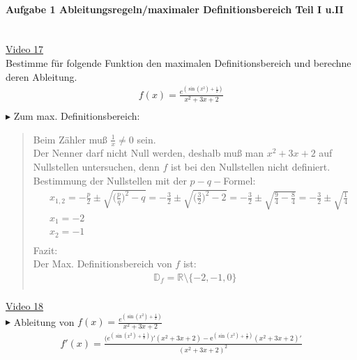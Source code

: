 \paragraph{Aufgabe 1 Ableitungsregeln/maximaler Definitionsbereich Teil I u.II}$  $\vspace*{3mm}\\
\href{https://youtu.be/fz6oN4-i_84}{Video 17}\\
Bestimme für folgende Funktion den maximalen Definitionsbereich und berechne deren Ableitung.\\
\begin{align*}
f(x)=\frac{e^{(\sin(x^2)+\frac{1}{x})}}{x^2+3x+2}\\
\end{align*}
\newpage
\noindent
$\blacktriangleright$ Zum max. Definitionsbereich:\\
\begin{quote}
	Beim Zähler muß $ \frac{1}{x}\neq 0 $ sein.\\
	Der Nenner darf nicht Null werden, deshalb muß man $ x^2+3x+2 $ auf Nullstellen untersuchen, denn $ f $ ist bei den Nullstellen nicht definiert.\\
	Bestimmung der Nullstellen mit der $ p-q- $Formel:\\
	\begin{align*}
	&x_{1,2}=-\frac{p}{2}\pm\sqrt{\bigg(\frac{p}{q}\bigg)^2-q}=-\frac{3}{2}\pm \sqrt{\bigg(\frac{3}{2}\bigg)^2-2}=-\frac{3}{2}\pm \sqrt{\frac{9}{4}-\frac{8}{4}}=-\frac{3}{2}\pm \sqrt{\frac{1}{4}}\\
	&x_1=-2\\
	&x_2=-1\\
	\end{align*}
	Fazit:\\
	Der Max. Definitionsbereich von $ f $ ist:\\
	\begin{align*}
	\mathbb{D}_f=\mathbb{R}\setminus \{-2,-1,0\}\\
	\end{align*}
\end{quote}
\href{https://youtu.be/2hB1iRS_O8w}{Video 18}\\
$ \blacktriangleright $ Ableitung von $ f(x)=\frac{e^{(\sin(x^2)+\frac{1}{x})}}{x^2+3x+2} $\\
\begin{align*}
f'(x)=\frac{\bigg(e^{(\sin(x^2)+\frac{1}{x})}\bigg)'(x^2+3x+2)-\mathrm{e}^{(\sin(x^2)+\frac{1}{x})}(x^2+3x+2)'}{(x^2+3x+2)^2}\\
\end{align*}
